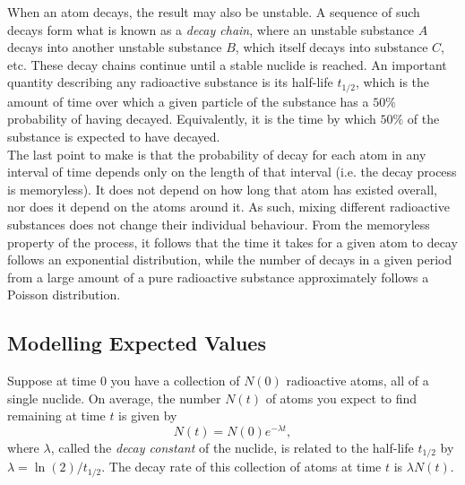 \documentclass[11pt]{m2pi}
\begin{document}
When an atom decays, the result may also be unstable. A sequence of such decays form what is known as a \textit{decay chain}, where an unstable substance $A$ decays into another unstable substance $B$, which itself decays into substance $C$, etc. These decay chains continue until a stable nuclide is reached.
An important quantity describing any radioactive substance is its half-life $t_{1/2}$, which is the amount of time over which a given particle of the substance has a $50\%$ probability of having decayed. Equivalently, it is the time by which $50\%$ of the substance is expected to have decayed. \\

The last point to make is that the probability of decay for each atom in any interval of time depends only on the length of that interval (i.e. the decay process is memoryless). It does not depend on how long that atom has existed overall, nor does it depend on the atoms around it. As such, mixing different radioactive substances does not change their individual behaviour. From the memoryless property of the process, it follows that the time it takes for a given atom to decay follows an exponential distribution, while the number of decays in a given period from a large amount of a pure radioactive substance approximately follows a Poisson distribution. %

\subsection{Modelling Expected Values}\label{SS:ModellingExpectedValues}
Suppose at time $0$ you have a collection of $N(0)$ radioactive atoms, all of a single nuclide. On average, the number $N(t)$ of atoms you expect to find remaining at time $t$ is given by
\[ N(t)=N(0)e^{-\lambda t}, \]
where $\lambda$, called the \textit{decay constant} of the nuclide, is related to the half-life $t_{1/2}$ by $\lambda=\ln(2)/t_{1/2}$.
The decay rate of this collection of atoms at time $t$ is $\lambda N(t)$.\\
\end{document}
